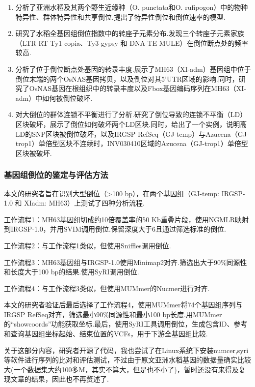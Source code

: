 \begin{enumerate}
	\item 分析了亚洲水稻及其两个野生近缘种（O. punctata和O. rufipogon）中的物种特异性、群体特异性和共享倒位.提出了特异性倒位和倒位速率的模型.
	\item 研究了水稻全基因组倒位指数中的转座子元素分布.发现三个转座子元素家族（LTR-RT Ty1-copia、Ty3-gypsy 和 DNA-TE MULE）在倒位断点处的频率较高.
	\item 分析了位于倒位断点处基因的转录丰度.展示了MH63（XI-adm）基因组中位于倒位末端的两个OsNAS基因拷贝，以及倒位对其5'UTR区域的影响.同时，研究了OsNAS基因在根组织中的转录丰度以及Fbox基因编码序列在MH63（XI-adm）中如何被倒位破坏.
	\item 对大倒位的群体连锁不平衡进行了分析.研究了倒位导致的连锁不平衡（LD）区块破坏，展示了倒位如何破坏两个LD区块.同时，给出了一个实例，说明高LD的SNP区块被倒位破坏，以及IRGSP RefSeq（GJ-temp）与Azucena（GJ-trop1）单倍型区块不连续时，INV030410区域的Azucena（GJ-trop1）单倍型区块被破坏.
\end{enumerate}

\subsubsection{基因组倒位的鉴定与评估方法}

本文的研究者旨在识别大型倒位（>100 bp），在两个基因组（GJ-temp: IRGSP-1.0 和 XIadm: MH63）上测试了四种分析流程.

工作流程1：MH63基因组切成约10倍覆盖率的50 Kb重叠片段，使用NGMLR映射到IRGSP-1.0，并用SVIM调用倒位.保留深度大于6且通过筛选标准的倒位.

工作流程2：与工作流程1类似，但使用Sniffles调用倒位.

工作流程3：MH63基因组与IRGSP-1.0使用Minimap2对齐.筛选出大于90\%同源性和长度大于100 bp的结果.使用SyRI调用倒位.

工作流程4：与工作流程3类似，但使用MUMmer的Nucmer进行对齐.

本文的研究者验证后最后选择了工作流程4，使用MUMmer将74个基因组序列与IRGSP RefSeq对齐，筛选最小90\%同源性和最小100 bp长度.用MUMmer的“showcoords”功能获取坐标.最后，使用SyRI工具调用倒位，生成包含ID、参考和查询基因组坐标起始、结束位置的VCFs，用于下游全基因组比较.

关于这部分内容，研究者开源了代码，我也尝试了在Linux系统下安装numcer,syri等软件进行序列的比对和评估测试，不过由于原文亚洲水稻基因的数据量确实比较大(一个数据集大约100多M，其实不算大，但是也不小了)，暂时还没有来得及复现文章的结果，因此也不再赘述了.

